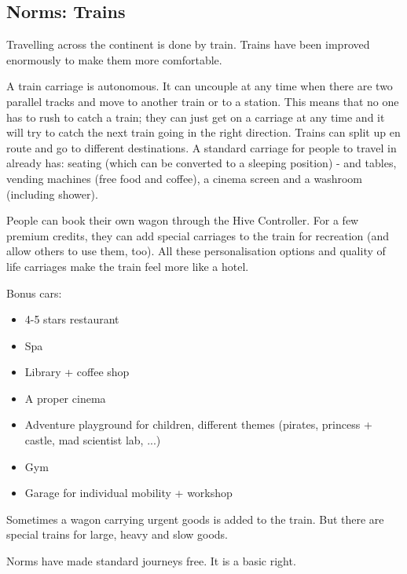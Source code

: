 \subsection{Norms: Trains}

Travelling across the continent is done by train. Trains have been improved enormously to make them more comfortable.

A train carriage is autonomous. It can uncouple at any time when there are two parallel tracks and move to another train or to a station. This means that no one has to rush to catch a train; they can just get on a carriage at any time and it will try to catch the next train going in the right direction.
Trains can split up en route and go to different destinations.
A standard carriage for people to travel in already has: seating (which can be converted to a sleeping position) - and tables, vending machines (free food and coffee), a cinema screen and a washroom (including shower).

People can book their own wagon through the Hive Controller. For a few premium credits, they can add special carriages to the train for recreation (and allow others to use them, too). All these personalisation options and quality of life carriages make the train feel more like a hotel.

Bonus cars:

\begin{itemize}
    \item 4-5 stars restaurant
    \item Spa
    \item Library + coffee shop
    \item A proper cinema
    \item Adventure playground for children, different themes (pirates, princess + castle, mad scientist lab, ...)
    \item Gym
    \item Garage for individual mobility + workshop
\end{itemize}

Sometimes a wagon carrying urgent goods is added to the train. But there are special trains for large, heavy and slow goods.

Norms have made standard journeys free. It is a basic right.




